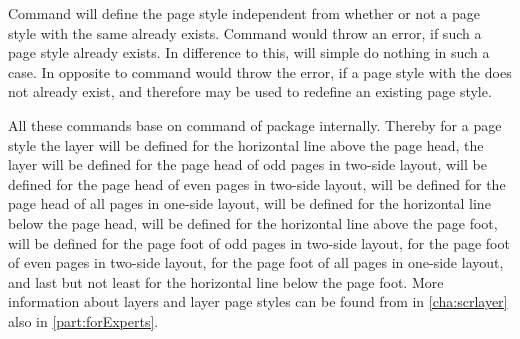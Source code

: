Command  will define the page style independent from
whether or not a page style with the same  already exists. Command
 would throw an error, if such a page style already
exists. In difference to this,  will simple do nothing
in such a case. In opposite to  command
 would throw the error, if a page style with the
 does not already exist, and therefore may be used to redefine an
existing page style.

All these commands base on command  of package
 internally. Thereby for a page style  the
layer  will be defined for the horizontal
line above the page head, the layer  will be
defined for the page head of odd pages in two-side layout,
 will be defined for the page head of even pages
in two-side layout,  will be defined for the
page head of all pages in one-side layout, 
will be defined for the horizontal line below the page head,
 will be defined for the horizontal line
above the page foot,  will be defined for the
page foot of odd pages in two-side layout,  for
the page foot of even pages in two-side layout,
 for the page foot of all pages in one-side
layout, and last but not least  for the
horizontal line below the page foot. More information about layers and layer
page styles can be found from  in
\autoref{cha:scrlayer} also in \autoref{part:forExperts}.%
%
